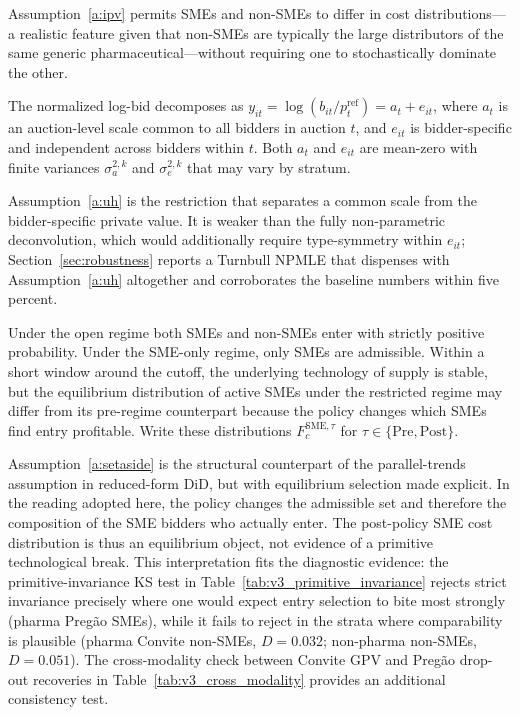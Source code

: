 Assumption~\ref{a:ipv} permits SMEs and non-SMEs to differ in cost distributions---a realistic feature given that non-SMEs are typically the large distributors of the same generic pharmaceutical---without requiring one to stochastically dominate the other.

\begin{assumption}\label{a:uh}
The normalized log-bid decomposes as $y_{it} = \log(b_{it} / p_t^{\mathrm{ref}}) = a_t + e_{it}$, where $a_t$ is an auction-level scale common to all bidders in auction $t$, and $e_{it}$ is bidder-specific and independent across bidders within $t$. Both $a_t$ and $e_{it}$ are mean-zero with finite variances $\sigma_a^{2,k}$ and $\sigma_e^{2,k}$ that may vary by stratum.
\end{assumption}

Assumption~\ref{a:uh} is the \citet{krasnokutskaya2011} restriction that separates a common scale from the bidder-specific private value. It is weaker than the fully non-parametric \citet{kotlarski1967} deconvolution, which would additionally require type-symmetry within $e_{it}$; Section~\ref{sec:robustness} reports a Turnbull NPMLE that dispenses with Assumption~\ref{a:uh} altogether and corroborates the baseline numbers within five percent.

\begin{assumption}\label{a:setaside}
Under the open regime both SMEs and non-SMEs enter with strictly positive probability. Under the SME-only regime, only SMEs are admissible. Within a short window around the cutoff, the underlying technology of supply is stable, but the equilibrium distribution of active SMEs under the restricted regime may differ from its pre-regime counterpart because the policy changes which SMEs find entry profitable. Write these distributions $F_c^{\mathrm{SME},\tau}$ for $\tau \in \{\mathrm{Pre},\mathrm{Post}\}$.
\end{assumption}

Assumption~\ref{a:setaside} is the structural counterpart of the parallel-trends assumption in reduced-form DiD, but with equilibrium selection made explicit. In the \citet{atheyseira2011} reading adopted here, the policy changes the admissible set and therefore the composition of the SME bidders who actually enter. The post-policy SME cost distribution is thus an equilibrium object, not evidence of a primitive technological break. This interpretation fits the diagnostic evidence: the primitive-invariance KS test in Table~\ref{tab:v3_primitive_invariance} rejects strict invariance precisely where one would expect entry selection to bite most strongly (pharma Preg\~ao SMEs), while it fails to reject in the strata where comparability is plausible (pharma Convite non-SMEs, $D = 0.032$; non-pharma non-SMEs, $D = 0.051$). The cross-modality check between Convite GPV and Preg\~ao drop-out recoveries in Table~\ref{tab:v3_cross_modality} provides an additional consistency test.

